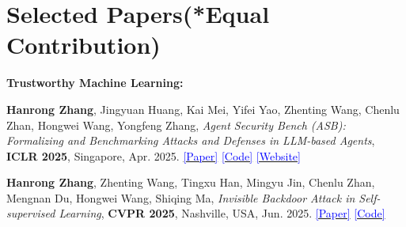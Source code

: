 \documentclass[letterpaper,11pt]{article}
\begin{document}
\section{Selected Papers(*Equal Contribution)}

\noindent\textbf{Trustworthy Machine Learning:}
\begin{enumerate}[itemsep=1pt, topsep=1pt, parsep=1pt, leftmargin=*, label={[\arabic*]}]
    \item \small{\textbf{Hanrong Zhang}, Jingyuan Huang, Kai Mei, Yifei Yao, Zhenting Wang, Chenlu Zhan, Hongwei Wang, Yongfeng Zhang, \textit{Agent Security Bench (ASB): Formalizing and Benchmarking Attacks and Defenses in LLM-based Agents}, \textbf{ICLR 2025}, Singapore, Apr. 2025. \href{https://arxiv.org/abs/2410.02644}{\textcolor{blue}{[Paper]}} \href{https://github.com/agiresearch/ASB}{\textcolor{blue}{[Code]}} \href{https://luckfort.github.io/ASBench/}{\textcolor{blue}{[Website]}}
    }
    \item \small{\textbf{Hanrong Zhang}, Zhenting Wang, Tingxu Han, Mingyu Jin, Chenlu Zhan, Mengnan Du, Hongwei Wang, Shiqing Ma, \textit{Invisible Backdoor Attack in Self-supervised Learning}, \textbf{CVPR 2025}, Nashville, USA, Jun. 2025. \href{https://arxiv.org/abs/2405.14672}{\textcolor{blue}{[Paper]}} \href{https://github.com/Zhang-Henry/INACTIVE}{\textcolor{blue}{[Code]}}
    }
\end{enumerate}
\end{document}
